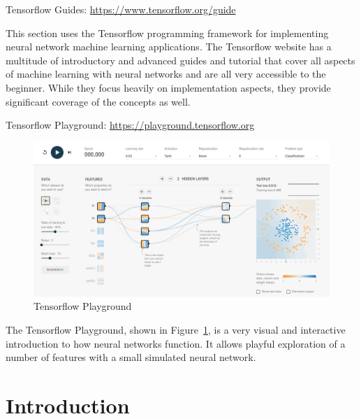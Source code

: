 \begin{tcolorbox}[colback=alert]
Tensorflow Guides: \url{https://www.tensorflow.org/guide}
\end{tcolorbox}

This section uses the Tensorflow programming framework for implementing neural network machine learning applications. The Tensorflow website has a multitude of introductory and advanced guides and tutorial that cover all aspects of machine learning with neural networks and are all very accessible to the beginner. While they focus heavily on implementation aspects, they provide significant coverage of the concepts as well.

\begin{tcolorbox}[colback=alert]
Tensorflow Playground: \url{https://playground.tensorflow.org}
\end{tcolorbox}

\begin{figure}
\centering
\includegraphics[width=.9\textwidth]{tensorflowplayground.png}
\caption{Tensorflow Playground}
\label{fig:tensorflowplayground}
\end{figure}

The Tensorflow Playground, shown in Figure~\ref{fig:tensorflowplayground}, is a very visual and interactive introduction to how neural networks function. It allows playful exploration of a number of features with a small simulated neural network.

\FloatBarrier

\section{Introduction}

